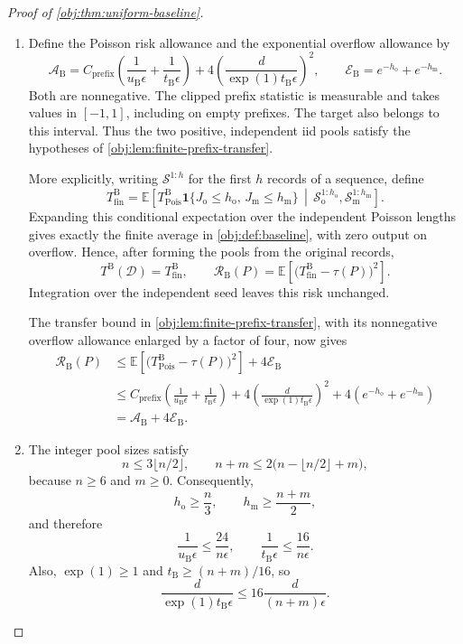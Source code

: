 \begin{proof}[Proof of \cref{obj:thm:uniform-baseline}]
\begin{enumerate}
\item
Define the Poisson risk allowance and the exponential overflow allowance by
\[
\mathcal A_{\mathrm B}
=
C_{\mathrm{prefix}}
\left(
\frac{1}{u_{\mathrm B}\epsilon}
+
\frac{1}{t_{\mathrm B}\epsilon}
\right)
+
4\left(\frac{d}{\exp(1)t_{\mathrm B}\epsilon}\right)^2,
\qquad
\mathcal E_{\mathrm B}
=
e^{-h_{\mathrm o}}+e^{-h_{\mathrm m}}.
\]
Both are nonnegative. The clipped prefix statistic is measurable and takes values in \([-1,1]\), including on empty prefixes. The target also belongs to this interval. Thus the two positive, independent iid pools satisfy the hypotheses of
\cref{obj:lem:finite-prefix-transfer}.

More explicitly, writing \(\mathcal S^{1:h}\) for the first \(h\) records of a sequence, define
\[
T_{\mathrm{fin}}^{\mathrm B}
=
\mathbb E\!\left[
T_{\mathrm{Pois}}^{\mathrm B}
\mathbf1\{J_{\mathrm o}\le h_{\mathrm o},\,
J_{\mathrm m}\le h_{\mathrm m}\}
\,\middle|\,
\mathcal S_{\mathrm o}^{1:h_{\mathrm o}},
\mathcal S_{\mathrm m}^{1:h_{\mathrm m}}
\right].
\]
Expanding this conditional expectation over the independent Poisson lengths gives exactly the finite average in \cref{obj:def:baseline}, with zero output on overflow. Hence, after forming the pools from the original records,
\[
T^{\mathrm B}(\mathcal D)=T_{\mathrm{fin}}^{\mathrm B},
\qquad
\mathcal R_{\mathrm B}(P)
=
\mathbb E\!\left[
\bigl(T_{\mathrm{fin}}^{\mathrm B}-\tau(P)\bigr)^2
\right].
\]
Integration over the independent seed leaves this risk unchanged.

The transfer bound in \cref{obj:lem:finite-prefix-transfer}, with its nonnegative overflow allowance enlarged by a factor of four, now gives
\[
\begin{aligned}
\mathcal R_{\mathrm B}(P)
&\le
\mathbb E\!\left[
\bigl(T_{\mathrm{Pois}}^{\mathrm B}-\tau(P)\bigr)^2
\right]
+
4\mathcal E_{\mathrm B}\\
&\le
C_{\mathrm{prefix}}
\left(
\frac{1}{u_{\mathrm B}\epsilon}
+
\frac{1}{t_{\mathrm B}\epsilon}
\right)
+
4\left(\frac{d}{\exp(1)t_{\mathrm B}\epsilon}\right)^2
+
4\left(e^{-h_{\mathrm o}}+e^{-h_{\mathrm m}}\right)\\
&=
\mathcal A_{\mathrm B}+4\mathcal E_{\mathrm B}.
\end{aligned}
\]

\item
The integer pool sizes satisfy
\[
n\le3\lfloor n/2\rfloor,
\qquad
n+m\le2\bigl(n-\lfloor n/2\rfloor+m\bigr),
\]
because \(n\ge6\) and \(m\ge0\). Consequently,
\[
h_{\mathrm o}\ge\frac n3,
\qquad
h_{\mathrm m}\ge\frac{n+m}{2},
\]
and therefore
\[
\frac{1}{u_{\mathrm B}\epsilon}
\le\frac{24}{n\epsilon},
\qquad
\frac{1}{t_{\mathrm B}\epsilon}
\le\frac{16}{n\epsilon}.
\]
Also, \(\exp(1)\ge1\) and \(t_{\mathrm B}\ge(n+m)/16\), so
\[
\frac{d}{\exp(1)t_{\mathrm B}\epsilon}
\le
16\frac{d}{(n+m)\epsilon}.
\]


\end{enumerate}
\end{proof}

